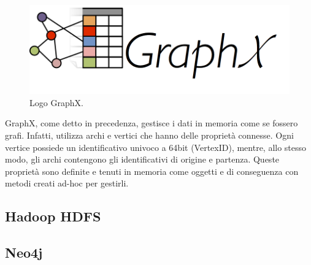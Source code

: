 \begin{figure}[H]
	\centering
	\includegraphics[width=\textwidth]{images/graphxLogo.png}
	\caption{Logo GraphX.}
	\label{fig:graphxLogo}
\end{figure}
GraphX, come detto in precedenza, gestisce i dati in memoria come se fossero grafi. Infatti, utilizza archi e vertici che hanno delle proprietà  connesse. Ogni vertice possiede un identificativo univoco a 64bit (VertexID), mentre, allo stesso modo, gli archi contengono gli identificativi di origine e partenza. Queste proprietà sono definite e tenuti in memoria come oggetti e di conseguenza con metodi creati ad-hoc per gestirli.  


\subsection{Hadoop HDFS}
\label{sec:hadoop HDFS}

\subsection{Neo4j}
\label{sec:neo4j}


